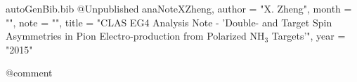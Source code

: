 \begin{filecontents*}{autoGenBib.bib}
@Unpublished{ anaNoteXZheng,
	author = "X. Zheng",
	month = "",
	note = "",
	title = "{CLAS EG4 Analysis Note - 'Double- and Target Spin Asymmetries in Pion Electro-production from Polarized NH$_3$ Targets'}",
	year = "2015"
}

@comment %

\end{filecontents*}
